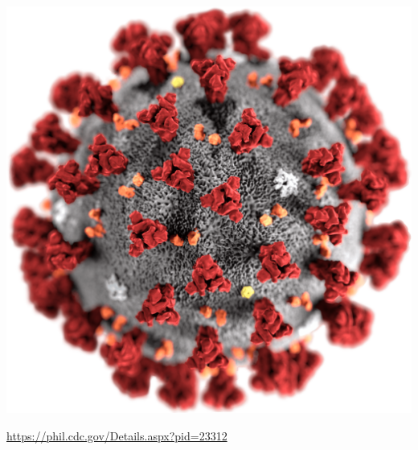 \documentclass[aspectratio=169]{beamer}
\begin{document}
\begin{frame}

\begin{center}
\includegraphics[height = 0.9\textheight]{figures/covid}
\end{center}

\vfill
\tiny{\url{https://phil.cdc.gov/Details.aspx?pid=23312}}
\end{frame}


\frame{\titlepage}
\end{document}
